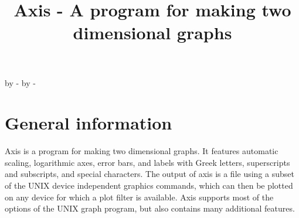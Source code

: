 %
%


\topmargin 0pt
\advance \topmargin by -\headheight
\advance \topmargin by -\headsep

\textheight 8.9in

\oddsidemargin 0pt
\evensidemargin \oddsidemargin
\marginparwidth 0.5in

\textwidth 6.5in






\def\displaybegin{\par\begingroup\medskip\narrower\narrower\noindent
		  \obeylines\obeyspaces}
\def\displayend{\endgroup\smallskip\noindent}

\newcommand{\bs}{$\backslash$}


\title{Axis - A program for making two dimensional graphs}
\author{}

\date{}

\maketitle

\section{General information}
Axis is a program for making two dimensional graphs.  It features
automatic scaling, logarithmic axes, error bars, and labels with Greek
letters, superscripts and subscripts, and special characters.
The output of axis is a file using a subset of the UNIX device independent
graphics commands, which can then be plotted on any device for which a 
plot filter is available.  Axis supports most of the options of the
UNIX graph program, but also contains many additional features.

